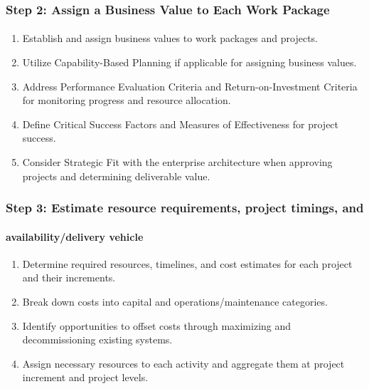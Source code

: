 \documentclass[aspectratio=169, table]{beamer}
\begin{document}
	\begin{frame}
		\frametitle{Step 2: Assign a Business Value to Each Work Package}
		\framesubtitle{\hspace{1cm}}
		\vspace{20pt}
			\begin{enumerate}
				\item Establish and assign business values to work packages and projects.
				\item Utilize Capability-Based Planning if applicable for assigning business values.
				\item Address Performance Evaluation Criteria and Return-on-Investment Criteria for monitoring progress and resource allocation.
				\item Define Critical Success Factors and Measures of Effectiveness for project success.
				\item Consider Strategic Fit with the enterprise architecture when approving projects and determining deliverable value.
			\end{enumerate}
	\end{frame}

	\begin{frame}
	\frametitle{Step 3: Estimate resource requirements, project timings, and}
	\framesubtitle{availability/delivery vehicle}
	\vspace{20pt}
		\begin{enumerate}
			\item Determine required resources, timelines, and cost estimates for each project and their increments.
			\item Break down costs into capital and operations/maintenance categories.
			\item Identify opportunities to offset costs through maximizing and decommissioning existing systems.
			\item Assign necessary resources to each activity and aggregate them at project increment and project levels.
		\end{enumerate}
\end{frame}
\end{document}
